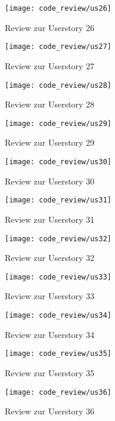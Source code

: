 \begin{figure}[H]
\centering
\texttt{[image: code\_review/us26]}
\caption{Review zur Userstory 26}
\end{figure}

\begin{figure}[H]
\centering
\texttt{[image: code\_review/us27]}
\caption{Review zur Userstory 27}
\end{figure}

\begin{figure}[H]
\centering
\texttt{[image: code\_review/us28]}
\caption{Review zur Userstory 28}
\end{figure}

\begin{figure}[H]
\centering
\texttt{[image: code\_review/us29]}
\caption{Review zur Userstory 29}
\end{figure}

\begin{figure}[H]
\centering
\texttt{[image: code\_review/us30]}
\caption{Review zur Userstory 30}
\end{figure}

\begin{figure}[H]
\centering
\texttt{[image: code\_review/us31]}
\caption{Review zur Userstory 31}
\end{figure}

\begin{figure}[H]
\centering
\texttt{[image: code\_review/us32]}
\caption{Review zur Userstory 32}
\end{figure}

\begin{figure}[H]
\centering
\texttt{[image: code\_review/us33]}
\caption{Review zur Userstory 33}
\end{figure}

\begin{figure}[H]
\centering
\texttt{[image: code\_review/us34]}
\caption{Review zur Userstory 34}
\end{figure}

\begin{figure}[H]
\centering
\texttt{[image: code\_review/us35]}
\caption{Review zur Userstory 35}
\end{figure}

\begin{figure}[H]
\centering
\texttt{[image: code\_review/us36]}
\caption{Review zur Userstory 36}
\end{figure}

